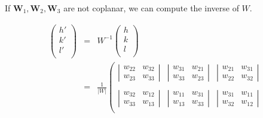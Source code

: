 \documentclass[prb]{revtex4}%
\begin{document}
If $\textbf{W}_1, \textbf{W}_2, \textbf{W}_3$ are not coplanar, we can compute the inverse of $W$.


\begin{eqnarray}
  \left(
      \begin{array}{c}
        h' \\
        k' \\
        l' \\
      \end{array}
    \right) &=& W^{-1}\left(
      \begin{array}{c}
        h \\
        k \\
        l \\
      \end{array}
    \right) \\
   &=& \frac{1}{|W|}
   \left(
     \begin{array}{ccc}
       \left|\begin{array}{cc}
               w_{22} & w_{32} \\
               w_{23} & w_{33}
             \end{array}
       \right| & \left|\begin{array}{cc}
               w_{31} & w_{21} \\
               w_{33} & w_{23}
             \end{array}
       \right| & \left|\begin{array}{cc}
               w_{21} & w_{31} \\
               w_{22} & w_{32}
             \end{array}
       \right| \\
       \\
        \left|\begin{array}{cc}
               w_{32} & w_{12} \\
               w_{33} & w_{13}
             \end{array}
       \right| & \left|\begin{array}{cc}
               w_{11} & w_{31} \\
               w_{13} & w_{33}
             \end{array}
       \right| & \left|\begin{array}{cc}
               w_{31} & w_{11} \\
               w_{32} & w_{12}
             \end{array}
       \right| \\

\end{array}
\end{eqnarray}
\end{document}
